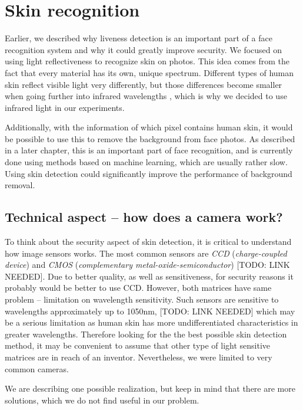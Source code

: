 \chapter{Skin recognition}
    Earlier, we described why liveness detection is an important part
    of a face recognition system and why it could greatly improve security.
    We focused on using light reflectiveness to recognize skin on photos.
    This idea comes from the fact that every material has its own, unique spectrum.
    Different types of human skin reflect visible light very differently,
    but those differences become smaller when going further into infrared wavelengths
    \cite{visinfra} \cite{toyotaskin}, which is why we decided to use infrared light
    in our experiments.

    Additionally, with the information of which pixel contains human skin,
    it would be possible to use this to remove the background from face photos.
    As described in a later chapter, this is an important part of face recognition,
    and is currently done using methods based on machine learning, which are usually
    rather slow.
    Using skin detection could significantly improve the performance of background
    removal.

    \section{Technical aspect -- how does a camera work?}
        To think about the security aspect of skin detection,
        it is critical to understand how image sensors works.
        The most common sensors are \textit{CCD} (\textit{charge-coupled device})
        and \textit{CMOS} (\textit{complementary metal-oxide-semiconductor})
        [TODO: LINK NEEDED].
        Due to better quality, as well as sensitiveness, for security reasons
        it probably would be better to use CCD.
        However, both matrices have same problem -- limitation on wavelength sensitivity.
        Such sensors are sensitive to wavelengths approximately up to 1050nm, [TODO: LINK NEEDED]
        which may be a serious limitation as human skin has more undifferentiated
        characteristics in greater wavelengths.
        Therefore looking for the the best possible skin detection method,
        it may be convenient to assume that other type of light sensitive matrices
        are in reach of an inventor.
        Nevertheless, we were limited to very common cameras.

        We are describing one possible realization, but keep in mind that
        there are more solutions, which we do not find useful in our problem.

